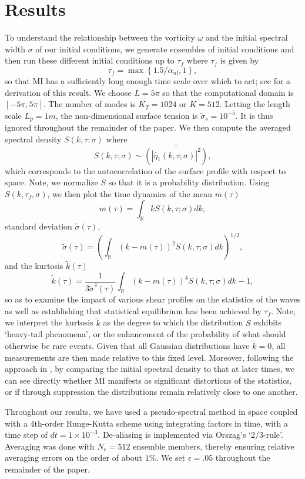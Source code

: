 \documentclass[a4paper,11pt]{article}
\begin{document}
\section{Results}
To understand the relationship between the vorticity $\omega$ and the initial spectral width $\sigma$ of our initial conditions, we generate ensembles of initial conditions and then run these different initial conditions up to $\tau_{f}$ where $\tau_{f}$ is given by
\[
\tau_{f}=\max\left\{1.5/\alpha_{nl},1\right\},
\]
so that MI has a sufficiently long enough time scale over which to act; see \cite{curtis8} for a derivation of this result.  We choose $L=5\pi$ so that the computational domain is $[-5\pi,5\pi]$.  The number of modes is $K_{T} = 1024$ or $K=512$.  Letting the length scale $L_{p}=1m$, the non-dimensional surface tension is $\tilde{\sigma}_{s} = 10^{-5}$.  It is thus ignored throughout the remainder of the paper.  We then compute the averaged spectral density $S(k,\tau;\sigma)$ where 
\[
S\left(k,\tau;\sigma\right) \sim \overline{\left( \left|\hat{\eta}_{1}\left(k,\tau;\sigma \right)\right|^{2}\right)},
\]
which corresponds to the autocorrelation of the surface profile with respect to space.  Note, we normalize $S$ so that it is a probability distribution.  Using $S(k,\tau_{f},\sigma)$, we then plot the time dynamics of the mean $m(\tau)$
\[
m(\tau) = \int_{\mathbb{R}} k S\left(k,\tau;\sigma\right) dk,
\]
standard deviation $\tilde{\sigma}(\tau)$,
\[
\tilde{\sigma}(\tau) = \left(\int_{\mathbb{R}} (k-m(\tau))^{2} S\left(k,\tau;\sigma\right) dk\right)^{1/2},
\]
and the kurtosis $\tilde{k}(\tau)$
\[
\tilde{k}(\tau) = \frac{1}{3\tilde{\sigma}^{4}(\tau)}\int_{\mathbb{R}} (k-m(\tau))^{4} S\left(k,\tau;\sigma\right) dk - 1,
\]
so as to examine the impact of various shear profiles on the statistics of the waves as well as establishing that statistical equilibrium has been achieved by $\tau_{f}$.  Note, we interpret the kurtosis $\tilde{k}$ as the degree to which the distribution $S$ exhibits `heavy-tail phenomena', or the enhancement of the probability of what should otherwise be rare events.  Given that all Gaussian distributions have $\tilde{k}=0$, all measurements are then made relative to this fixed level.  Moreover, following the approach in \cite{dysthe2,dysthe3}, by comparing the initial spectral density to that at later times, we can see directly whether MI manifests as significant distortions of the statistics, or if through suppression the distributions remain relatively close to one another.  

Throughout our results, we have used a pseudo-spectral method in space coupled with a 4th-order Runge-Kutta scheme using integrating factors in time, with a time step of $dt = 1 \times 10^{-3}$.  De-aliasing is implemented via Orszag's `2/3-rule'.  Averaging was done with $N_{e}=512$ ensemble members, thereby ensuring relative averaging errors on the order of about $1\%$.  We set $\epsilon=.05$ throughout the remainder of the paper.  
\end{document}
